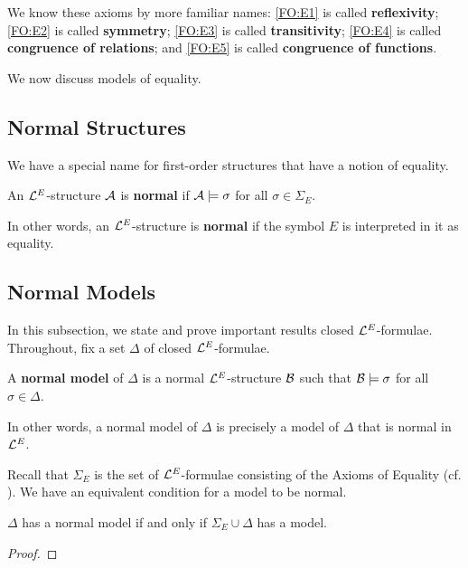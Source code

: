 We know these axioms by more familiar names: \ref{FO:E1} is called \textbf{reflexivity}; \ref{FO:E2} is called \textbf{symmetry}; \ref{FO:E3} is called \textbf{transitivity}; \ref{FO:E4} is called \textbf{congruence of relations}; and \ref{FO:E5} is called \textbf{congruence of functions}.

We now discuss models of equality.

\subsection{Normal Structures}

We have a special name for first-order structures that have a notion of equality.

\begin{boxdefinition}
    An $\mathcal{L}^{E}$-structure $\mathcal{A}$ is \textbf{normal} if $\mathcal{A} \models \sigma$ for all $\sigma \in \Sigma_{E}$.
\end{boxdefinition}

In other words, an $\mathcal{L}^{E}$-structure is \textbf{normal} if the symbol $E$ is interpreted in it as equality.

\sorry %

\subsection{Normal Models}

In this subsection, we state and prove important results closed $\mathcal{L}^{E}$-formulae. Throughout, fix a set $\Delta$ of closed $\mathcal{L}^{E}$-formulae.

\begin{boxdefinition}
    A \textbf{normal model} of $\Delta$ is a normal $\mathcal{L}^{E}$-structure $\mathcal{B}$ such that $\mathcal{B} \models \sigma$ for all $\sigma \in \Delta$.
\end{boxdefinition}
In other words, a normal model of $\Delta$ is precisely a model of $\Delta$ that is normal in $\mathcal{L}^{E}$.

Recall that $\Sigma_E$ is the set of $\mathcal{L}^{E}$-formulae consisting of the Axioms of Equality (cf. ). We have an equivalent condition for a model to be normal.

\begin{boxlemma}\label{Ch2:Lemma:Equiv_Def_Normal_Model}
    $\Delta$ has a normal model if and only if $\Sigma_E \cup \Delta$ has a model.
\end{boxlemma}
\begin{proof}
    \sorry
\end{proof}


